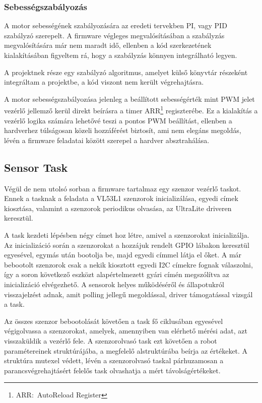 \subsubsection{Sebességszabályozás}

A motor sebességének szabályozására az eredeti tervekben PI, vagy PID szabályzó
szerepelt. A firmware végleges megvalósításában a szabályzás megvalósítására már
nem maradt idő, ellenben a kód szerkezetének kialakításában figyeltem rá, hogy a
szabályzás könnyen integrálható legyen.

A projektnek része egy szabályzó algoritmus, amelyet külső könyvtár
részeként integráltam a projektbe\cite{pid_library}, a kód viszont nem került
végrehajtásra.

A motor sebességszabályozása jelenleg a beállított sebességérték mint PWM jelet
vezérlő jellemző kerül direkt beírásra a timer ARR\footnote{ARR:~AutoReload Register}
regiszterébe. Ez a kialakítás a vezérlő logika számára lehetővé teszi a pontos
PWM beállítást, ellenben a hardverhez túlságosan közeli hozzáférést biztosít, ami
nem elegáns megoldás, lévén a firmware feladatai között szerepel a hardver
absztrahálása.

\subsection{Sensor Task}

Végül de nem utolsó sorban a firmware tartalmaz egy szenzor vezérlő taskot. Ennek
a tasknak a feladata a VL53L1 szenzorok inicializálása, egyedi címek kiosztása,
valamint a szenzorok periodikus olvasása, az UltraLite driveren keresztül.

\medskip

A task kezdeti lépésben négy címet hoz létre, amivel a szenzorokat
inicializálja. Az inicializáció során a szenzorokat a hozzájuk rendelt GPIO
lábakon keresztül egyesével, egymás után bootolja be, majd egyedi címmel látja el
őket. A már bebootolt szenzorok csak a nekik kiosztott egyedi I2C címekre fognak
válaszolni, így a soron következő eszközt alapértelmezett gyári címén megszólítva
az inicializáció elvégezhető. A sensorok helyes működéséről és állapotukról
visszajelzést adnak, amit polling jellegű megoldással, driver támogatással
vizsgál a task.

Az összes szenzor bebootolását követően a task fő ciklusában egyesével
végigolvassa a szenzorokat, amelyek, amennyiben van elérhető mérési adat, azt
visszaküldik a vezérlő fele. A szenzorolvasó task ezt követően a robot
paramétereinek struktúrájába, a megfelelő alstruktúrába beírja az értékeket. A
struktúra mutexel védett, lévén a szenzorolvasó taskal párhuzamosan a
parancsvégrehajtásért felelős task olvashatja a mért távolságértékeket. 

